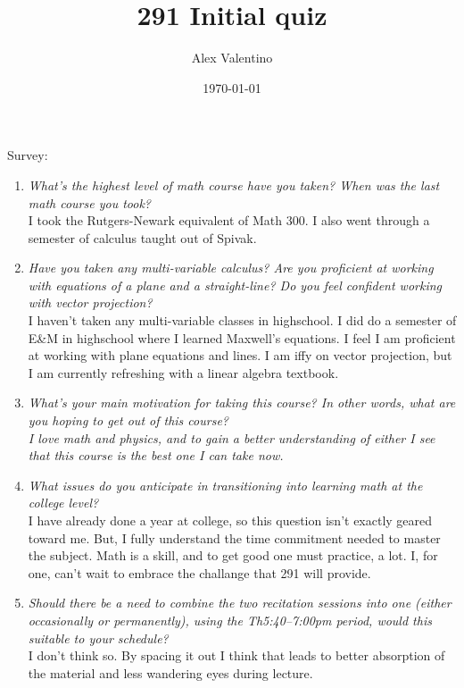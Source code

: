 \documentclass[12pt, letterpaper]{article}
\date{\today}
\author{Alex Valentino}
\title{291 Initial quiz}
\begin{document}
Survey:
\begin{enumerate}
	\item \textit{What's the highest level of math course have you taken? When was the last math course you took?}\\
	I took the Rutgers-Newark equivalent of Math 300. I also went through a semester of calculus taught out of Spivak.  
	\item \textit{Have you taken any multi-variable calculus? Are you proficient at working with equations of a plane and a straight-line? Do you feel
confident working with vector projection?}\\
I haven't taken any multi-variable classes in highschool.
I did do a semester of E\&M in highschool where I learned Maxwell's equations.  
I feel I am proficient at working with plane equations and lines.
I am iffy on vector projection, but I am currently refreshing with a linear algebra textbook.
\item \textit{What's your main motivation for taking this course? In other words, what are you hoping to get out of this course?\\
I love math and physics, and to gain a better understanding of either I see that this course is the best one I can take now.}  
\item \textit{What issues do you anticipate in transitioning into learning math at the college level?}\\
I have already done a year at college, so this question isn't exactly geared toward me.  But, I fully understand the time commitment needed to master the subject.  Math is a skill, and to get good one must practice, a lot.  I, for one, can't wait to embrace the challange that 291 will provide.
\item \textit{Should there be a need to combine the two recitation sessions into one (either occasionally or permanently), using the Th5:40–7:00pm period, would this suitable to your schedule?}\\
I don't think so.  By spacing it out I think that leads to better absorption of the material and less wandering eyes during lecture.  

\end{enumerate}
\end{document}
